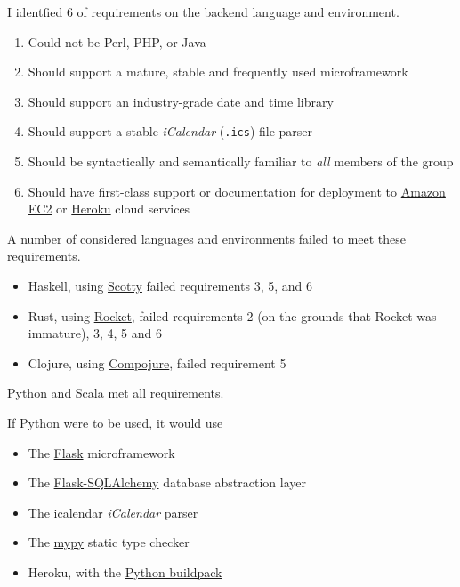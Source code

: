\documentclass[11pt,a4paper]{report}
\begin{document}
I identfied 6 of requirements on the backend language and environment.

\begin{enumerate}
    \item Could not be Perl, PHP, or Java
    \item Should support a mature, stable and frequently used microframework
    \item Should support an industry-grade date and time library
    \item Should support a stable \textit{iCalendar} (\texttt{.ics}) file parser
    \item Should be syntactically and semantically familiar to \textit{all} members of the group
    \item Should have first-class support or documentation for deployment to \href{http://docs.aws.amazon.com/AWSEC2/latest/UserGuide/concepts.html}{Amazon EC2} or \href{https://www.heroku.com/}{Heroku} cloud services
 \end{enumerate}

A number of considered languages and environments failed to meet these requirements.

\begin{itemize}
    \item Haskell, using \href{https://github.com/scotty-web/scotty}{Scotty} failed requirements 3, 5, and 6
    \item Rust, using \href{https://rocket.rs/overview/}{Rocket}, failed requirements 2 (on the grounds that Rocket was immature), 3, 4, 5 and 6
    \item Clojure, using \href{https://github.com/weavejester/compojure}{Compojure}, failed requirement 5
\end{itemize}

Python and Scala met all requirements. 

If Python were to be used, it would use

\begin{itemize} 
    \item The \href{http://flask.pocoo.org/}{Flask} microframework
    \item The \href{http://flask-sqlalchemy.pocoo.org/2.1/}{Flask-SQLAlchemy} database abstraction layer
    \item The \href{https://pypi.python.org/pypi/icalendar}{icalendar} \textit{iCalendar} parser
    \item The \href{http://mypy-lang.org/}{mypy} static type checker
    \item Heroku, with the \href{https://github.com/heroku/heroku-buildpack-python}{Python buildpack}
\end{itemize}
\end{document}
